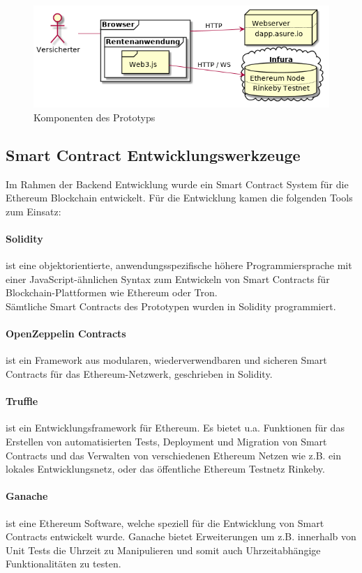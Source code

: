 \begin{figure}
    \centering
    \includegraphics[width=6.0in]{images/components.png}
    \caption{Komponenten des Prototyps}
\end{figure}


\subsection*{Smart Contract Entwicklungswerkzeuge}
Im Rahmen der Backend Entwicklung wurde ein Smart Contract System für die Ethereum Blockchain entwickelt. Für die Entwicklung kamen die folgenden Tools zum Einsatz:

\paragraph*{Solidity} ist eine objektorientierte, anwendungsspezifische höhere Programmiersprache mit einer JavaScript-ähnlichen Syntax zum Entwickeln von Smart Contracts für Blockchain-Plattformen wie Ethereum oder Tron.\\ %
Sämtliche Smart Contracts des Prototypen wurden in Solidity programmiert.

\paragraph*{OpenZeppelin Contracts} ist ein Framework aus modularen, wiederverwendbaren und sicheren Smart Contracts für das Ethereum-Netzwerk, geschrieben in Solidity.

\paragraph*{Truffle} ist ein Entwicklungsframework für Ethereum. Es bietet u.a. Funktionen für das Erstellen von automatisierten Tests, Deployment und Migration von Smart Contracts und das Verwalten von verschiedenen Ethereum Netzen wie z.B. ein lokales Entwicklungsnetz, oder das öffentliche Ethereum Testnetz Rinkeby.

\paragraph*{Ganache} ist eine Ethereum Software, welche speziell für die Entwicklung von Smart Contracts entwickelt wurde. Ganache bietet Erweiterungen um z.B. innerhalb von Unit Tests die Uhrzeit zu Manipulieren und somit auch Uhrzeitabhängige Funktionalitäten zu testen.


